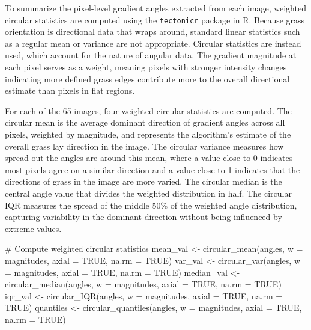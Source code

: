 \documentclass[
]{article}
\newenvironment{Shaded}{\begin{snugshade}}{\end{snugshade}}
\newcommand{\AttributeTok}[1]{\textcolor[rgb]{0.40,0.45,0.13}{#1}}
\newcommand{\CommentTok}[1]{\textcolor[rgb]{0.37,0.37,0.37}{#1}}
\newcommand{\ConstantTok}[1]{\textcolor[rgb]{0.56,0.35,0.01}{#1}}
\newcommand{\FunctionTok}[1]{\textcolor[rgb]{0.28,0.35,0.67}{#1}}
\newcommand{\NormalTok}[1]{\textcolor[rgb]{0.00,0.23,0.31}{#1}}
\newcommand{\OtherTok}[1]{\textcolor[rgb]{0.00,0.23,0.31}{#1}}
\begin{document}
To summarize the pixel-level gradient angles extracted from each image,
weighted circular statistics are computed using the \texttt{tectonicr}
package in R. Because grass orientation is directional data that wraps
around, standard linear statistics such as a regular mean or variance
are not appropriate. Circular statistics are instead used, which account
for the nature of angular data. The gradient magnitude at each pixel
serves as a weight, meaning pixels with stronger intensity changes
indicating more defined grass edges contribute more to the overall
directional estimate than pixels in flat regions.

For each of the 65 images, four weighted circular statistics are
computed. The circular mean is the average dominant direction of
gradient angles across all pixels, weighted by magnitude, and represents
the algorithm's estimate of the overall grass lay direction in the
image. The circular variance measures how spread out the angles are
around this mean, where a value close to 0 indicates most pixels agree
on a similar direction and a value close to 1 indicates that the
directions of grass in the image are more varied. The circular median is
the central angle value that divides the weighted distribution in half.
The circular IQR measures the spread of the middle 50\% of the weighted
angle distribution, capturing variability in the dominant direction
without being influenced by extreme values.

\begin{Shaded}
\begin{Highlighting}[]
\CommentTok{\# Compute weighted circular statistics}
\NormalTok{  mean\_val }\OtherTok{\textless{}{-}} \FunctionTok{circular\_mean}\NormalTok{(angles, }\AttributeTok{w =}\NormalTok{ magnitudes, }\AttributeTok{axial =} \ConstantTok{TRUE}\NormalTok{, }\AttributeTok{na.rm =} \ConstantTok{TRUE}\NormalTok{)}
\NormalTok{  var\_val }\OtherTok{\textless{}{-}} \FunctionTok{circular\_var}\NormalTok{(angles, }\AttributeTok{w =}\NormalTok{ magnitudes, }\AttributeTok{axial =} \ConstantTok{TRUE}\NormalTok{, }\AttributeTok{na.rm =} \ConstantTok{TRUE}\NormalTok{)}
\NormalTok{  median\_val }\OtherTok{\textless{}{-}} \FunctionTok{circular\_median}\NormalTok{(angles, }\AttributeTok{w =}\NormalTok{ magnitudes, }\AttributeTok{axial =} \ConstantTok{TRUE}\NormalTok{, }\AttributeTok{na.rm =} \ConstantTok{TRUE}\NormalTok{)}
\NormalTok{  iqr\_val }\OtherTok{\textless{}{-}} \FunctionTok{circular\_IQR}\NormalTok{(angles, }\AttributeTok{w =}\NormalTok{ magnitudes, }\AttributeTok{axial =} \ConstantTok{TRUE}\NormalTok{, }\AttributeTok{na.rm =} \ConstantTok{TRUE}\NormalTok{)}
\NormalTok{  quantiles }\OtherTok{\textless{}{-}} \FunctionTok{circular\_quantiles}\NormalTok{(angles, }\AttributeTok{w =}\NormalTok{ magnitudes, }\AttributeTok{axial =} \ConstantTok{TRUE}\NormalTok{, }\AttributeTok{na.rm =} \ConstantTok{TRUE}\NormalTok{)}
  
\end{Highlighting}
\end{Shaded}
\end{document}
